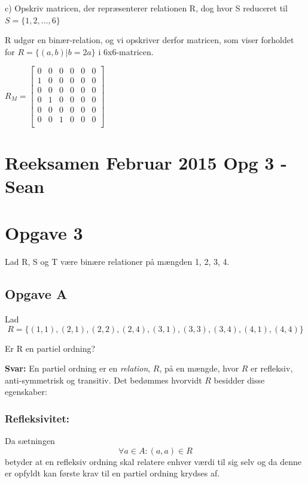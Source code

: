 \documentclass{article}
\begin{document}
c) Opskriv matricen, der repræsenterer relationen R, dog hvor S reduceret til $S = \{1,2,...,6\}$

R udgør en binær-relation, og vi opskriver derfor matricen, som viser forholdet for $R = \{ (a,b)  |  b = 2a\}$ i 6x6-matricen.

\begin{center}
\begin{math}
R_M = \begin{bmatrix}
0 & 0 & 0 & 0 & 0 & 0\\
1 & 0 & 0 & 0 & 0 & 0\\
0 & 0 & 0 & 0 & 0 & 0\\
0 & 1 & 0 & 0 & 0 & 0\\
0 & 0 & 0 & 0 & 0 & 0\\
0 & 0 & 1 & 0 & 0 & 0\\

\end{bmatrix}
\end{math}
\end{center}









\section{Reeksamen Februar 2015 Opg 3 - Sean}
\section{Opgave 3}
Lad R, S og T være binære relationer på mængden {1, 2, 3, 4}.


\subsection{Opgave A}
Lad \[R = \{(1, 1),(2, 1),(2, 2),(2, 4),(3, 1),(3, 3),(3, 4),(4, 1),(4, 4)\}\]

Er R en partiel ordning?

\textbf{Svar:}
{En partiel ordning er en \emph{relation}, $R$, på en mængde,  hvor $R$ er refleksiv, anti-symmetrisk og transitiv. Det bedømmes hvorvidt $R$ besidder disse egenskaber:}


\subsubsection{Refleksivitet:}
Da sætningen \[\forall a \in A : (a,a) \in R\] betyder at en refleksiv ordning skal relatere enhver værdi til sig selv og da denne er opfyldt kan første krav til en partiel ordning krydses af.
\end{document}
